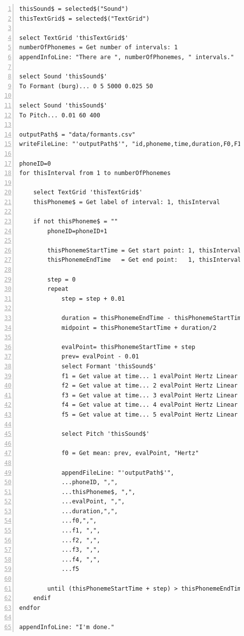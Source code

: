 \documentclass[a4paper,11pt]{article}
\begin{document}
\begin{Verbatim}[numbers=left,fontsize=\scriptsize, firstnumber=1,firstline=1,commandchars=\\\{\},xleftmargin=0.5cm,tabsize=2,frame=lines,framesep=3mm]
thisSound$ = selected$("Sound")
thisTextGrid$ = selected$("TextGrid")

select TextGrid 'thisTextGrid$'
numberOfPhonemes = Get number of intervals: 1
appendInfoLine: "There are ", numberOfPhonemes, " intervals."

select Sound 'thisSound$'
To Formant (burg)... 0 5 5000 0.025 50

select Sound 'thisSound$'
To Pitch... 0.01 60 400

outputPath$ = "data/formants.csv"
writeFileLine: "'outputPath$'", "id,phoneme,time,duration,F0,F1,F2,F3,F4,F5"

phoneID=0
for thisInterval from 1 to numberOfPhonemes

    select TextGrid 'thisTextGrid$'
    thisPhoneme$ = Get label of interval: 1, thisInterval
    
    if not thisPhoneme$ = ""
        phoneID=phoneID+1
        
        thisPhonemeStartTime = Get start point: 1, thisInterval
        thisPhonemeEndTime   = Get end point:   1, thisInterval
       
        step = 0
        repeat
            step = step + 0.01
            
            duration = thisPhonemeEndTime - thisPhonemeStartTime
            midpoint = thisPhonemeStartTime + duration/2
            
            evalPoint= thisPhonemeStartTime + step
            prev= evalPoint - 0.01
            select Formant 'thisSound$'
            f1 = Get value at time... 1 evalPoint Hertz Linear
            f2 = Get value at time... 2 evalPoint Hertz Linear
            f3 = Get value at time... 3 evalPoint Hertz Linear
            f4 = Get value at time... 4 evalPoint Hertz Linear
            f5 = Get value at time... 5 evalPoint Hertz Linear
            
            select Pitch 'thisSound$'
            
            f0 = Get mean: prev, evalPoint, "Hertz"
            
            appendFileLine: "'outputPath$'", 
            ...phoneID, ",", 
            ...thisPhoneme$, ",",
            ...evalPoint, ",",
            ...duration,",",
            ...f0,",",
            ...f1, ",", 
            ...f2, ",", 
            ...f3, ",", 
            ...f4, ",", 
            ...f5
    
        until (thisPhonemeStartTime + step) > thisPhonemeEndTime
    endif
endfor

appendInfoLine: "I'm done."
\end{Verbatim}
\end{document}
